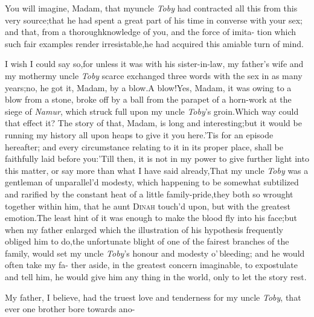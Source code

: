 \documentclass{article}
\begin{document}
You will imagine, Madam, that my\break uncle \textit{Toby} had
contracted all this from this very source;\tsk  that he had spent a great
part of his time in converse with your sex; and that, from a
thorough\break knowledge of you, and the force of imita- tion which such
fair examples render irresistable\sic,\tsk he had acquired this amiable
turn of mind.

I wish I could say so,\tsk  for unless it was with his
sister-in-law, my father’s wife and my mother\tsh  my
uncle \textit{Toby} scarce exchanged three words with the sex in as
many years;\tsh  no, he got it, Madam, by a
blow.\tsh  A blow!\tsk  Yes, Madam, it was owing to a
blow from a stone, broke off by a ball from the parapet of a
horn-work at the siege of \textit{Namur}, which struck full upon my uncle
\textit{Toby}’s groin.\tsk  Which way could that effect it?
The story of that, Madam, is long and interesting;\tsk  but it
would be running my history all upon heaps to give it you
here.\tsh  ’Tis for an episode hereafter; and every
circumstance relating to it in its proper place, shall be
faithfully laid before you:\tsk  ’Till then, it is not in my
power to give further light into this matter, or say more than what I have said
already,\tsk  That my uncle \textit{Toby} was\break
a gentleman of unparallel’d modesty,\break
which happening to be somewhat
subtilized and rarified by the constant heat of a little
family-pride,\tsk  they
both so wrought together within him, that he
aunt \textsc{Dinah} touch’d upon, but with the greatest
emotion.\tsk  The least
hint of it was enough to make the blood fly into his face;\tsk  but when my father
enlarged
which the illustration of his hypothesis
frequently obliged him to do,\tsh  the un\-fortunate blight of one of the fairest
branches of the family, would set my uncle \textit{Toby}’s honour and modesty
o’\,bleed\-ing; and he would often take my fa- ther aside, in the greatest concern
imaginable, to expostulate and tell him, he would give him any thing in the world,
only to let the story rest.

My father, I believe, had the truest love and tenderness for my uncle \textit{Toby},
that ever one brother bore towards ano-\break
{}
\end{document}
